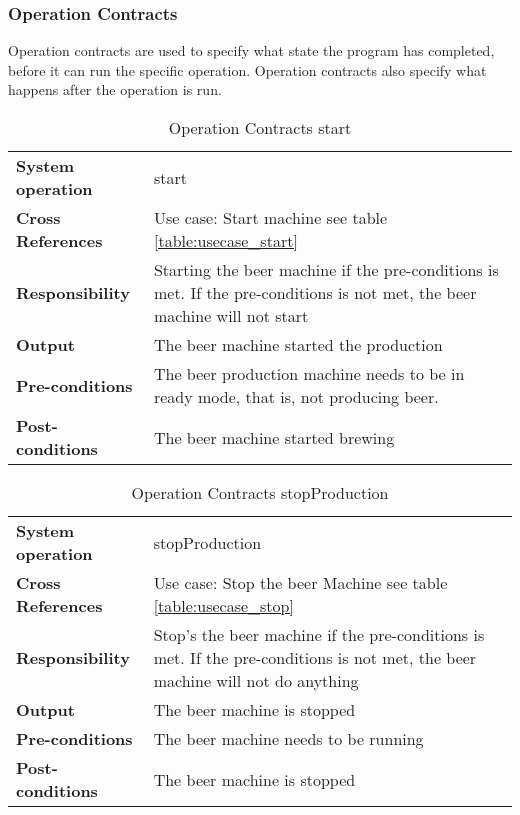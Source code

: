\subsubsection{Operation Contracts}
Operation contracts are used to specify what state the program has completed, 
before it can run the specific operation. 
Operation contracts also specify what happens after the operation is run.
\begin{table}[H]
    \begin{tabularx}{\textwidth}{|>{\RaggedRight}p{3.7cm}|>{\RaggedRight}X|}
        \hline
        \multicolumn{2}{|c|}{\textbf{start}}\\
        \hline
        \textbf{System operation} & start\\
        \hline
        \textbf{Cross References} & Use case: Start machine see table \ref{table:usecase_start} \\
        \hline
        \textbf{Responsibility} & Starting the beer machine if the pre-conditions 
        is met.
            If the pre-conditions is not met, the beer machine will not start \\
        \hline
        \textbf{Output} & The beer machine started the production\\
        \hline
        \textbf{Pre-conditions} & 
            The beer production machine needs to be in
            ready mode, that is, not producing beer. \\
        \hline
        \textbf{Post-conditions} & The beer machine started brewing\\
        \hline
    \end{tabularx}
    \caption{Operation Contracts start} 
    \label{table:Operation_Contracts_start}
\end{table}

\begin{table}[H]
    \begin{tabularx}{\textwidth}{|>{\RaggedRight}p{3.7cm}|>{\RaggedRight}X|}
        \hline
        \multicolumn{2}{|c|}{\textbf{stopProduction}}\\
        \hline
        \textbf{System operation} & stopProduction\\
        \hline
        \textbf{Cross References} & Use case: Stop the beer Machine see table \ref{table:usecase_stop}\\
        \hline
        \textbf{Responsibility} & Stop's the beer machine if the pre-conditions is met.
        If the pre-conditions is not met, the beer machine will not do anything\\
        \hline
        \textbf{Output} & The beer machine is stopped\\
        \hline
        \textbf{Pre-conditions} & The beer machine needs to be running\\
        \hline
        \textbf{Post-conditions} & The beer machine is stopped\\
        \hline
    \end{tabularx}
    \caption{Operation Contracts stopProduction} 
    \label{table:Operation_Contracts_stopProduction}
\end{table}


